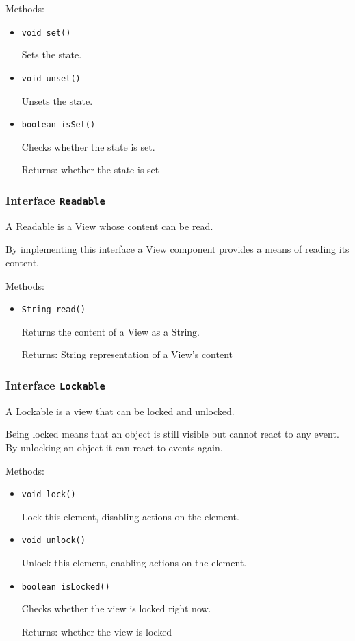 Methods:
\begin{itemize}
\item \texttt{void set()}

Sets the state.

\item \texttt{void unset()}

Unsets the state.

\item \texttt{boolean isSet()}

Checks whether the state is set.

Returns: whether the state is set

\end{itemize}

\subsubsection{Interface \texttt{Readable}}
\label{type:edu.kit.wavelength.client.view.api.Readable}
A Readable is a View whose content can be read.
 
 By implementing this interface a View component provides a means of reading
 its content.

Methods:
\begin{itemize}
\item \texttt{String read()}

Returns the content of a View as a String.

Returns: String representation of a View's content

\end{itemize}

\subsubsection{Interface \texttt{Lockable}}
\label{type:edu.kit.wavelength.client.view.api.Lockable}
A Lockable is a view that can be locked and unlocked.

 Being locked means that an object is still visible but cannot react to any event.
 By unlocking an object it can react to events again.

Methods:
\begin{itemize}
\item \texttt{void lock()}

Lock this element, disabling actions on the element.

\item \texttt{void unlock()}

Unlock this element, enabling actions on the element.

\item \texttt{boolean isLocked()}

Checks whether the view is locked right now.

Returns: whether the view is locked

\end{itemize}

